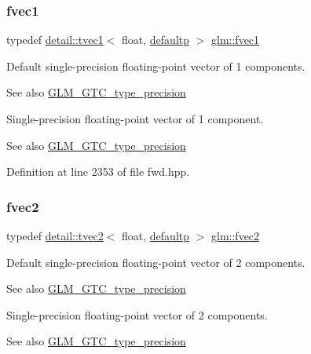 \subsubsection{\texorpdfstring{fvec1}{fvec1}}
{\footnotesize\ttfamily typedef \hyperlink{structglm_1_1detail_1_1tvec1}{detail\+::tvec1}$<$ float, \hyperlink{namespaceglm_a0f04f086094c747d227af4425893f545a9d21ccd8b5a009ec7eb7677befc3bf51}{defaultp} $>$ \hyperlink{group__gtc__type__precision_gab927d62f22fa57461367011950cec650}{glm\+::fvec1}}

Default single-\/precision floating-\/point vector of 1 components. \begin{DoxySeeAlso}{See also}
\hyperlink{group__gtc__type__precision}{G\+L\+M\+\_\+\+G\+T\+C\+\_\+type\+\_\+precision}
\end{DoxySeeAlso}
Single-\/precision floating-\/point vector of 1 component. \begin{DoxySeeAlso}{See also}
\hyperlink{group__gtc__type__precision}{G\+L\+M\+\_\+\+G\+T\+C\+\_\+type\+\_\+precision} 
\end{DoxySeeAlso}


Definition at line 2353 of file fwd.\+hpp.

\mbox{\label{group__gtc__type__precision_gaafd518792a4646c7bb60aabc62a4684c}} 
\subsubsection{\texorpdfstring{fvec2}{fvec2}}
{\footnotesize\ttfamily typedef \hyperlink{structglm_1_1detail_1_1tvec2}{detail\+::tvec2}$<$ float, \hyperlink{namespaceglm_a0f04f086094c747d227af4425893f545a9d21ccd8b5a009ec7eb7677befc3bf51}{defaultp} $>$ \hyperlink{group__gtc__type__precision_gaafd518792a4646c7bb60aabc62a4684c}{glm\+::fvec2}}

Default single-\/precision floating-\/point vector of 2 components. \begin{DoxySeeAlso}{See also}
\hyperlink{group__gtc__type__precision}{G\+L\+M\+\_\+\+G\+T\+C\+\_\+type\+\_\+precision}
\end{DoxySeeAlso}
Single-\/precision floating-\/point vector of 2 components. \begin{DoxySeeAlso}{See also}
\hyperlink{group__gtc__type__precision}{G\+L\+M\+\_\+\+G\+T\+C\+\_\+type\+\_\+precision} 
\end{DoxySeeAlso}


